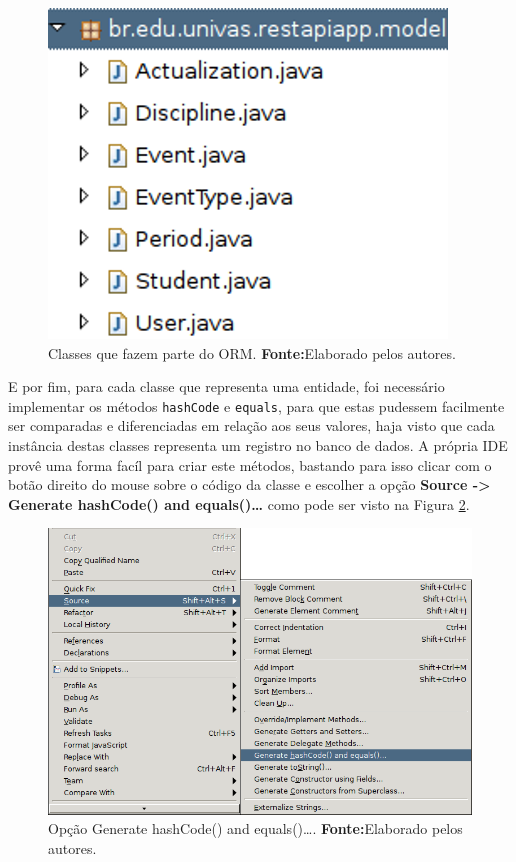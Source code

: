	
	\begin{figure}[h!]
		\centerline{\includegraphics[scale=0.8]{./imagens/2_q_metodologico/4_procedimentos_resultados/43_webservice/432_desenvolvimento/desws12.png}}
		\caption[Classes que fazem parte do ORM]{Classes que fazem parte do ORM.
			\textbf{Fonte:}Elaborado pelos autores.}
		\label{fig:desws12}
	\end{figure}
	
	\pagebreak

	\par E por fim, para cada classe que representa uma entidade, foi necessário
implementar os métodos \texttt{hashCode} e \texttt{equals}, para que estas
pudessem facilmente ser comparadas e diferenciadas em relação aos seus valores,
haja visto que cada instância destas classes representa um registro no banco de
dados. A própria IDE provê uma forma facíl para criar este métodos, bastando
para isso clicar com o botão direito do mouse sobre o código da classe e
escolher a opção \textbf{Source -> Generate hashCode() and equals()\ldots} como
pode ser visto na Figura \ref{fig:desws13}.

	\begin{figure}[h!]
		\centerline{\includegraphics[scale=0.8]{./imagens/2_q_metodologico/4_procedimentos_resultados/43_webservice/432_desenvolvimento/desws13.png}}
		\caption[Opção Generate hashCode() and equals()\ldots]{Opção Generate
		hashCode() and equals()\ldots .
			\textbf{Fonte:}Elaborado pelos autores.}
		\label{fig:desws13}
	\end{figure}
	
